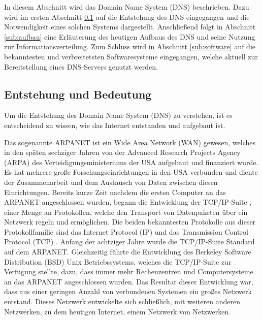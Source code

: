 \documentclass[a4paper, 12pt, BCOR10mm, DIV12, toc=bibliography, toc=listof, german]{scrbook}
\def \dns {Domain Name System (DNS)}
\begin{document}
		In diesem Abschnitt wird das \dns{} \cite{rfc1034,rfc1035} beschrieben. Dazu wird im ersten
		Abschnitt \ref{sub:entstehung} auf die Entstehung des DNS eingegangen und die Notwendigkeit
		eines solchen Systems dargestellt.  Anschließend folgt in Abschnitt \ref{sub:aufbau} eine
		Erläuterung des heutigen Aufbaus des DNS und seine Nutzung zur Informationsverteilung.
		Zum Schluss wird in Abschnitt \ref{sub:software} auf die bekanntesten und verbreitetsten
		Softwaresysteme eingegangen, welche aktuell zur Bereitstellung eines DNS-Servers genutzt werden.

			\subsection{Entstehung und Bedeutung} %
			\label{sub:entstehung}

			Um die Entstehung des \dns{} zu verstehen, ist es entscheidend zu wissen, wie das Internet
			entstanden und aufgebaut ist.
			
			Das sogenannte ARPANET ist ein Wide Area Network (WAN) gewesen, welches in den späten
			sechziger Jahren von der Advanced Research Projects Agency (ARPA) des
			Verteidigungsministeriums der USA aufgebaut und finanziert wurde. Es hat mehrere große
			Forschungseinrichtungen in den USA verbunden und diente der Zusammenarbeit und dem Austausch
			von Daten zwischen diesen Einrichtungen. Bereits kurze Zeit nachdem die ersten Computer an
			das ARPANET angeschlossen wurden, begann die Entwicklung der TCP/IP-Suite \cite{stevens1994},
			einer Menge an Protokollen, welche den Transport von Datenpaketen über ein Netzwerk regeln
			und ermöglichen.  Die beiden bekanntesten Protokolle aus dieser Protokollfamilie sind das
			Internet Protocol (IP) \cite{rfc791} und das Transmission Control Protocol (TCP)
			\cite{rfc793}. Anfang der achtziger Jahre wurde die TCP/IP-Suite Standard auf dem ARPANET.
			Gleichzeitig führte die Entwicklung des Berkeley Software Distribution (BSD) Unix
			Betriebssystems, welches die TCP/IP-Suite zur Verfügung stellte, dazu, dass immer mehr
			Rechenzentren und Computersysteme an das ARPANET angeschlossen wurden. Das Resultat dieser Entwicklung
			war, dass aus einer geringen Anzahl von verbundenen Systemen ein großes Netzwerk
			entstand. Dieses Netzwerk entwickelte sich schließlich, mit weiteren anderen Netzwerken, zu
			dem heutigen Internet, einem Netzwerk von Netzwerken.
\end{document}
